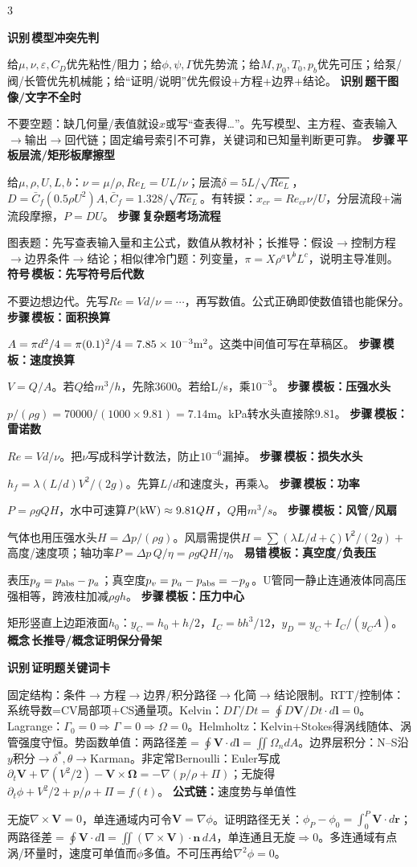 \documentclass[a4paper]{article}
\newcommand{\form}[1]{{\color{M}\bfseries 公式链：}#1\par}
\newcommand{\labtag}[3]{{\bfseries\color{#1}\colorbox{#1}{\color{white}\fontsize{2.35}{2.48}\selectfont #2}\,#3}\par}
\newcommand{\iden}[1]{\labtag{C}{识别}{#1}}
\newcommand{\step}[1]{\labtag{S}{步骤}{#1}}
\newcommand{\err}[1]{\labtag{R}{易错}{#1}}
\newcommand{\concept}[1]{\labtag{V}{概念}{#1}}
\newcommand{\sym}[1]{\labtag{F}{符号}{#1}}
\newcommand{\idq}[1]{\iden{#1}}
\newcommand{\stepq}[1]{\step{#1}}
\newcommand{\formq}[1]{\form{#1}}
\newcommand{\errq}[1]{\err{#1}}
\newcommand{\conceptq}[1]{\concept{#1}}
\newcommand{\symq}[1]{\sym{#1}}
\newenvironment{vfourWrap}{\par\begingroup\fontsize{2.68}{2.84}\selectfont\setlength{\fboxsep}{0.45pt}}{\par\endgroup}
\begin{document}
\begin{multicols}{3}
\begin{vfourWrap}
\idq{模型冲突先判}
给$\mu,\nu,\varepsilon,C_D$优先粘性/阻力；给$\phi,\psi,\Gamma$优先势流；给$M,p_0,T_0,p_b$优先可压；给泵/阀/长管优先机械能；给“证明/说明”优先假设+方程+边界+结论。
\idq{题干图像/文字不全时}
不要空题：缺几何量/表值就设$x$或写“查表得…”。先写模型、主方程、查表输入$\to$输出$\to$回代链；固定编号索引不可靠，关键词和已知量判断更可靠。
\stepq{平板层流/矩形板摩擦型}
给$\mu,\rho,U,L,b$：$\nu=\mu/\rho,Re_L=UL/\nu$；层流$\delta=5L/\sqrt{Re_L}$，$D=\bar C_f(0.5\rho U^2)A,\bar C_f=1.328/\sqrt{Re_L}$。有转捩：$x_{cr}=Re_{cr}\nu/U$，分层流段+湍流段摩擦，$P=DU$。
\stepq{复杂题考场流程}
图表题：先写查表输入量和主公式，数值从教材补；长推导：假设$\to$控制方程$\to$边界条件$\to$结论；相似律冷门题：列变量，$\pi=X\rho^aV^bL^c$，说明主导准则。
\symq{模板：先写符号后代数}
不要边想边代。先写$Re=Vd/\nu=\cdots$，再写数值。公式正确即使数值错也能保分。
\stepq{模板：面积换算}
$A=\pi d^2/4=\pi(0.1)^2/4=7.85\times10^{-3}{\rm m^2}$。这类中间值可写在草稿区。
\stepq{模板：速度换算}
$V=Q/A$。若$Q$给$m^3/h$，先除3600。若给L/s，乘$10^{-3}$。
\stepq{模板：压强水头}
$p/(\rho g)=70000/(1000\times9.81)=7.14$m。kPa转水头直接除9.81。
\stepq{模板：雷诺数}
$Re=Vd/\nu$。把$\nu$写成科学计数法，防止$10^{-6}$漏掉。
\stepq{模板：损失水头}
$h_f=\lambda(L/d)V^2/(2g)$。先算$L/d$和速度头，再乘$\lambda$。
\stepq{模板：功率}
$P=\rho gQH$，水中可速算$P({\rm kW})\approx9.81QH$，$Q$用$m^3/s$。
\stepq{模板：风管/风扇}
气体也用压强水头$H=\Delta p/(\rho g)$。风扇需提供$H=\sum(\lambda L/d+\zeta)V^2/(2g)+$高度/速度项；轴功率$P=\Delta p\,Q/\eta=\rho gQH/\eta$。
\errq{模板：真空度/负表压}
表压$p_g=p_{\rm abs}-p_a$；真空度$p_v=p_a-p_{\rm abs}=-p_g$。U管同一静止连通液体同高压强相等，跨液柱加减$\rho gh$。
\stepq{模板：压力中心}
矩形竖直上边距液面$h_0$：$y_C=h_0+h/2$，$I_C=bh^3/12$，$y_D=y_C+I_C/(y_CA)$。
\conceptq{长推导/概念证明保分骨架}
\idq{证明题关键词卡}
固定结构：条件$\to$方程$\to$边界/积分路径$\to$化简$\to$结论限制。RTT/控制体：系统导数=CV局部项+CS通量项。Kelvin：$D\Gamma/Dt=\oint D\bm V/Dt\cdot d\bm l=0$。Lagrange：$\Gamma_0=0\Rightarrow\Gamma=0\Rightarrow\Omega=0$。Helmholtz：Kelvin+Stokes得涡线随体、涡管强度守恒。势函数单值：两路径差$=\oint\bm V\cdot d\bm l=\iint\Omega_n dA$。边界层积分：N--S沿$y$积分$\to\delta^*,\theta\to$Karman。非定常Bernoulli：Euler写成$\partial_t\bm V+\nabla(V^2/2)-\bm V\times\bm\Omega=-\nabla(p/\rho+\Pi)$；无旋得$\partial_t\phi+V^2/2+p/\rho+\Pi=f(t)$。
\formq{速度势与单值性}
无旋$\nabla\times\bm V=0$，单连通域内可令$\bm V=\nabla\phi$。证明路径无关：$\phi_P-\phi_0=\int_0^P\bm V\cdot d\bm r$；两路径差$=\oint\bm V\cdot d\bm l=\iint(\nabla\times\bm V)\cdot\bm n\,dA$，单连通且无旋$\Rightarrow0$。多连通域有点涡/环量时，速度可单值而$\phi$多值。不可压再给$\nabla^2\phi=0$。

\end{vfourWrap}
\end{multicols}
\end{document}
